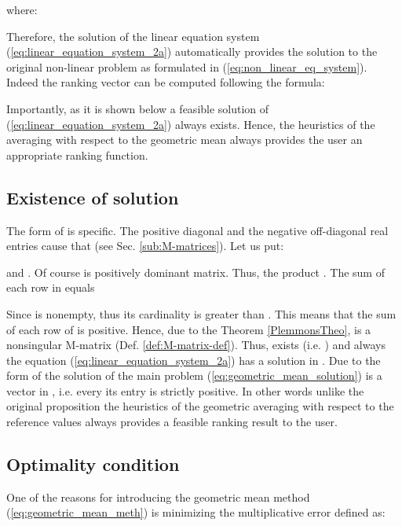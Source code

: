 where: 







Therefore, the solution  of the linear equation system
(\ref{eq:linear_equation_system_2a}) automatically provides the solution
to the original non-linear problem as formulated in (\ref{eq:non_linear_eq_system}).
Indeed the ranking vector  can be computed following the formula:



Importantly, as it is shown below a feasible solution of (\ref{eq:linear_equation_system_2a})
always exists. Hence, the heuristics of the averaging with respect
to the geometric mean always provides the user an appropriate ranking
function. 




\subsection{Existence of solution\label{sub:Existence-of-solution}}

The form of  is specific. The positive diagonal and
the negative off-diagonal real entries cause that 
(see Sec. \ref{sub:M-matrices}). Let us put:

and . Of course  is positively
dominant matrix. Thus, the product .
The sum of each row in  equals 

Since  is nonempty, thus its cardinality 
is greater than . This means that the sum of each row of 
is positive. Hence, due to the Theorem \ref{PlemmonsTheo}, 
is a nonsingular M-matrix (Def. \ref{def:M-matrix-def}). Thus, 
exists (i.e. ) and always the equation
(\ref{eq:linear_equation_system_2a}) has a solution in .
Due to the form of the solution of the main problem (\ref{eq:geometric_mean_solution})
 is a vector in , i.e. every its entry
is strictly positive. In other words unlike the original proposition
\citep{Kulakowski2013hrea} the heuristics of the geometric averaging
with respect to the reference values always provides a feasible ranking
result to the user.


\subsection{Optimality condition\label{sub:Optimality-condition}}

One of the reasons for introducing the geometric mean method (\ref{eq:geometric_mean_meth})
is minimizing the multiplicative error  \citep{Ishizaka2011rotm}
defined as:

